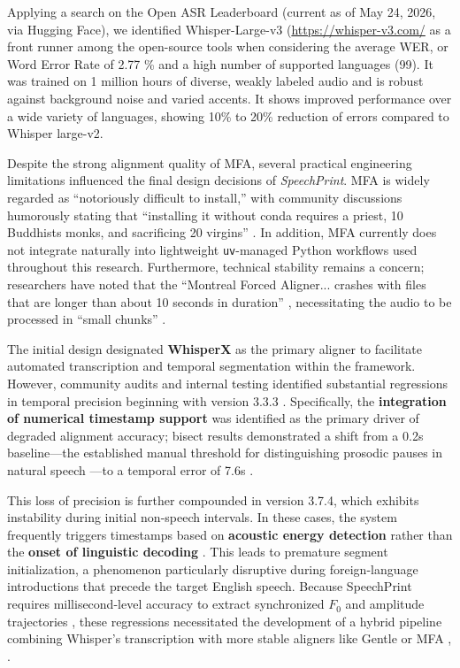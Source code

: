 Applying a search on the Open ASR Leaderboard \cite{srivastav2025} (current as of May 24, 2026, via Hugging Face), we identified Whisper-Large-v3 (\url{https://whisper-v3.com/} as a front runner among the open-source tools when considering the average WER, or Word Error Rate of 2.77 \% and a high number of supported languages (99). It was trained on 1 million hours of diverse, weakly labeled audio and is robust against background noise and varied accents. It shows improved performance over a wide variety of languages, showing 10\% to 20\% reduction of errors compared to Whisper large-v2.

Despite the strong alignment quality of MFA, several practical engineering limitations influenced the final design decisions of \textit{SpeechPrint}. MFA is widely regarded as ``notoriously difficult to install,'' with community discussions humorously stating that ``installing it without conda requires a priest, 10 Buddhists monks, and sacrificing 20 virgins'' \cite{bain2025whisperxissues1247}. In addition, MFA currently does not integrate naturally into lightweight \texttt{uv}-managed Python workflows used throughout this research. Furthermore, technical stability remains a concern; researchers have noted that the ``Montreal Forced Aligner... crashes with files that are longer than about 10 seconds in duration'' \cite[p. 7]{fromont2023accuracy}, necessitating the audio to be processed in ``small chunks'' \cite[p. 4]{babinski2019robin}.

The initial design designated \textbf{WhisperX} as the primary aligner to facilitate automated transcription and temporal segmentation within the framework. However, community audits and internal testing identified substantial regressions in temporal precision beginning with version 3.3.3 \cite{bain2025whisperxissues1220}. Specifically, the \textbf{integration of numerical timestamp support} was identified as the primary driver of degraded alignment accuracy; bisect results demonstrated a shift from a 0.2s baseline—the established manual threshold for distinguishing prosodic pauses in natural speech \cite{mistrorigo2018}—to a temporal error of 7.6s \cite{bain2025whisperxissues1220}. 

This loss of precision is further compounded in version 3.7.4, which exhibits instability during initial non-speech intervals. In these cases, the system frequently triggers timestamps based on \textbf{acoustic energy detection} rather than the \textbf{onset of linguistic decoding} \cite{bain2025whisperxissues1220}. This leads to premature segment initialization, a phenomenon particularly disruptive during foreign-language introductions that precede the target English speech. Because SpeechPrint requires millisecond-level accuracy to extract synchronized $F_0$ and amplitude trajectories \cite{jadoul2018parselmouth}, these regressions necessitated the development of a hybrid pipeline combining Whisper's transcription with more stable aligners like Gentle or MFA \cite{ochshorn2015gentle}, \cite{mcauliffe2017montreal}.


